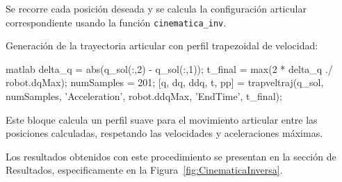 Se recorre cada posición deseada y se calcula la configuración articular correspondiente usando la función \texttt{cinematica\_inv}.

\bigskip

Generación de la trayectoria articular con perfil trapezoidal de velocidad:

\begin{matlabcode}{matlab}
	delta_q = abs(q_sol(:,2) - q_sol(:,1));
	t_final = max(2 * delta_q ./ robot.dqMax);
	numSamples = 201;
	[q, dq, ddq, t, pp] = trapveltraj(q_sol, numSamples, 'Acceleration', robot.ddqMax, 'EndTime', t_final);
\end{matlabcode}

Este bloque calcula un perfil suave para el movimiento articular entre las posiciones calculadas, respetando las velocidades y aceleraciones máximas.

\bigskip

Los resultados obtenidos con este procedimiento se presentan en la sección de Resultados, especificamente en la Figura~\ref{fig:CinematicaInversa}.